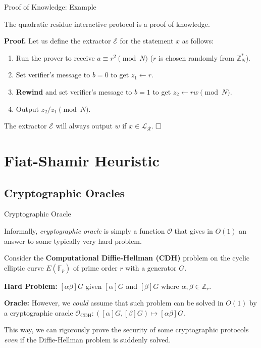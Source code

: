 \documentclass[xcolor={usenames,dvipsnames}]{beamer}
\begin{document}
    \begin{frame}{Proof of Knowledge: Example}
        \begin{lemma}
            The quadratic residue interactive protocol is a proof of knowledge.\pause
        \end{lemma}
        
        \textbf{Proof.} Let us define the extractor $\mathcal{E}$ for the statement $x$ as follows:
        \begin{enumerate}
            \item Run the prover to receive $a \equiv r^2 \pmod{N}$ ($r$ is chosen randomly from $\mathbb{Z}_N^*$).\pause
            \item Set verifier's message to $b=0$ to get $z_1 \gets r$.\pause
            \item \textbf{Rewind} and set verifier's message to $b=1$ to get $z_2 \gets rw \pmod{N}$.\pause
            \item Output $z_2/z_1 \pmod{N}$. \pause
        \end{enumerate}
        
        The extractor $\mathcal{E}$ will always output $w$ if $x \in \mathcal{L}_{\mathcal{R}}$. $\hfill\Box$
    \end{frame}

    \section{Fiat-Shamir Heuristic}
    \subsection{Cryptographic Oracles}
    \begin{frame}{Cryptographic Oracle}
        \begin{definition}
            Informally, \textit{cryptographic oracle} is simply a function $\mathcal{O}$ that gives in $O(1)$ an answer to some typically very hard problem. \pause  
        \end{definition}
        
        \begin{example}
            Consider the \textbf{Computational Diffie-Hellman (CDH)} problem on the cyclic elliptic curve $E(\mathbb{F}_p)$ of prime order $r$ with a generator $G$. \pause
            
            \textbf{Hard Problem:} $[\alpha\beta]G$ given $[\alpha]G$ and $[\beta]G$ where $\alpha,\beta \in \mathbb{Z}_r$. \pause
        
            \textbf{Oracle:} However, we \textit{could} assume that such problem can be solved in $O(1)$ by a cryptographic oracle $\mathcal{O}_{\text{CDH}}: ([\alpha]G,[\beta]G) \mapsto [\alpha\beta]G$. \pause
            
            This way, we can rigorously prove the security of some cryptographic protocols \textit{even} if the Diffie-Hellman problem is suddenly solved. 
        \end{example}
    \end{frame}
\end{document}

